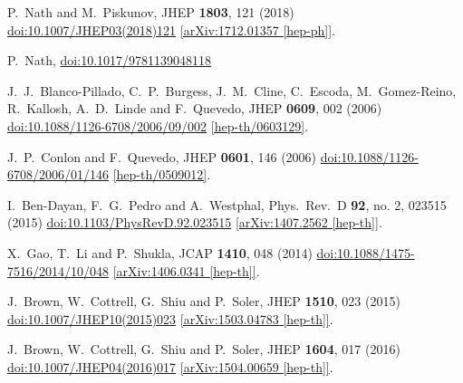 \documentclass[12pt]{article}
\begin{document}
\begin{thebibliography}{99}
  P.~Nath and M.~Piskunov,
  JHEP {\bf 1803}, 121 (2018)
  \href{https://dx.doi.org/10.1007/JHEP03(2018)121}{doi:10.1007/JHEP03(2018)121}
  \href{https://arxiv.org/abs/1712.01357}{[arXiv:1712.01357 [hep-ph]]}.

  P.~Nath,
  \href{https://dx.doi.org/10.1017/9781139048118}{doi:10.1017/9781139048118}

  J.~J.~Blanco-Pillado, C.~P.~Burgess, J.~M.~Cline, C.~Escoda, M.~Gomez-Reino, R.~Kallosh, A.~D.~Linde and F.~Quevedo,
  JHEP {\bf 0609}, 002 (2006)
  \href{https://dx.doi.org/10.1088/1126-6708/2006/09/002}{doi:10.1088/1126-6708/2006/09/002}
  \href{https://arxiv.org/abs/hep-th/0603129}{[hep-th/0603129]}.

  J.~P.~Conlon and F.~Quevedo,
  JHEP {\bf 0601}, 146 (2006)
  \href{https://dx.doi.org/10.1088/1126-6708/2006/01/146}{doi:10.1088/1126-6708/2006/01/146}
  \href{https://arxiv.org/abs/hep-th/0509012}{[hep-th/0509012]}.

  I.~Ben-Dayan, F.~G.~Pedro and A.~Westphal,
  Phys.\ Rev.\ D {\bf 92}, no. 2, 023515 (2015)
  \href{https://dx.doi.org/10.1103/PhysRevD.92.023515}{doi:10.1103/PhysRevD.92.023515}
  \href{https://arxiv.org/abs/1407.2562}{[arXiv:1407.2562 [hep-th]]}.

  X.~Gao, T.~Li and P.~Shukla,
  JCAP {\bf 1410}, 048 (2014)
  \href{https://dx.doi.org/10.1088/1475-7516/2014/10/048}{doi:10.1088/1475-7516/2014/10/048}
  \href{https://arxiv.org/abs/1406.0341}{[arXiv:1406.0341 [hep-th]]}.

  J.~Brown, W.~Cottrell, G.~Shiu and P.~Soler,
  JHEP {\bf 1510}, 023 (2015)
  \href{https://dx.doi.org/10.1007/JHEP10(2015)023}{doi:10.1007/JHEP10(2015)023}
  \href{https://arxiv.org/abs/1503.04783}{[arXiv:1503.04783 [hep-th]]}.

  J.~Brown, W.~Cottrell, G.~Shiu and P.~Soler,
  JHEP {\bf 1604}, 017 (2016)
  \href{https://dx.doi.org/10.1007/JHEP04(2016)017}{doi:10.1007/JHEP04(2016)017}
  \href{https://arxiv.org/abs/1504.00659}{[arXiv:1504.00659 [hep-th]]}.


\end{thebibliography}
\end{document}
